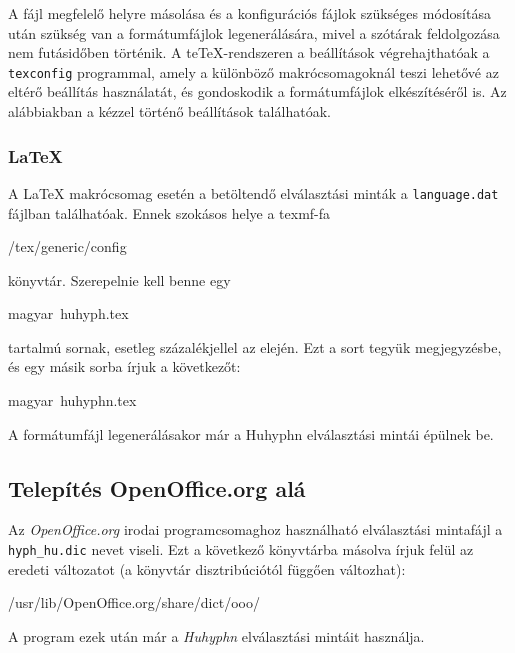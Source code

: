 \documentclass[12pt]{article}
\newenvironment{code}{%
  \begin{list}{}{\raggedright\normalfont\ttfamily}\item[]}
  {\end{list}
}
\begin{document}
A fájl megfelelő helyre másolása és a konfigurációs fájlok szükséges
módosítása után szükség van a formátumfájlok legenerálására, mivel
a szótárak feldolgozása nem futásidőben történik. A te\TeX{}-rendszeren
a beállítások végrehajthatóak a \texttt{texconfig} programmal, amely
a különböző makrócsomagoknál teszi lehetővé az eltérő beállítás használatát,
és gondoskodik a formátumfájlok elkészítéséről is. Az alábbiakban
a kézzel történő beállítások találhatóak.


\subsubsection{\LaTeX{}}

A \LaTeX{} makrócsomag esetén a betöltendő elválasztási minták a \texttt{language.dat}
fájlban találhatóak. Ennek szokásos helye a texmf-fa

\begin{code}
/tex/generic/config
\end{code}
könyvtár. Szerepelnie kell benne egy

\begin{code}
magyar~huhyph.tex
\end{code}
tartalmú sornak, esetleg százalékjellel az elején. Ezt a sort tegyük
megjegyzésbe, és egy másik sorba írjuk a következőt:

\begin{code}
magyar~huhyphn.tex
\end{code}
A formátumfájl legenerálásakor már a Huhyphn elválasztási mintái épülnek
be.


\subsection{Telepítés OpenOffice.org alá}

Az \emph{OpenOffice.org} irodai programcsomaghoz használható elválasztási
mintafájl a \texttt{hyph\_hu.dic} nevet viseli. Ezt a következő könyvtárba
másolva írjuk felül az eredeti változatot (a könyvtár disztribúciótól
függően változhat):

\begin{code}
/usr/lib/OpenOffice.org/share/dict/ooo/
\end{code}
A program ezek után már a \emph{Huhyphn} elválasztási mintáit használja.
\end{document}

